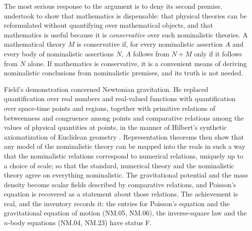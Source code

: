 \documentclass{situationist-preprint}
\begin{document}
The most serious response to the argument is to deny its second premise. \citet{Field1980} undertook to show that mathematics is dispensable: that physical theories can be reformulated without quantifying over mathematical objects, and that mathematics is useful because it is \emph{conservative} over such nominalistic theories. A mathematical theory $M$ is conservative if, for every nominalistic assertion $A$ and every body of nominalistic assertions $N$, $A$ follows from $N + M$ only if it follows from $N$ alone. If mathematics is conservative, it is a convenient means of deriving nominalistic conclusions from nominalistic premises, and its truth is not needed.

Field's demonstration concerned Newtonian gravitation. He replaced quantification over real numbers and real-valued functions with quantification over space-time points and regions, together with primitive relations of betweenness and congruence among points and comparative relations among the values of physical quantities at points, in the manner of Hilbert's synthetic axiomatization of Euclidean geometry \citep{Hilbert1899}. Representation theorems then show that any model of the nominalistic theory can be mapped into the reals in such a way that the nominalistic relations correspond to numerical relations, uniquely up to a choice of scale; so that the standard, numerical theory and the nominalistic theory agree on everything nominalistic. The gravitational potential and the mass density become scalar fields described by comparative relations, and Poisson's equation is recovered as a statement about those relations. The achievement is real, and the inventory records it: the entries for Poisson's equation and the gravitational equation of motion (NM.05, NM.06), the inverse-square law and the $n$-body equations (NM.04, NM.23) have status F.
\end{document}
